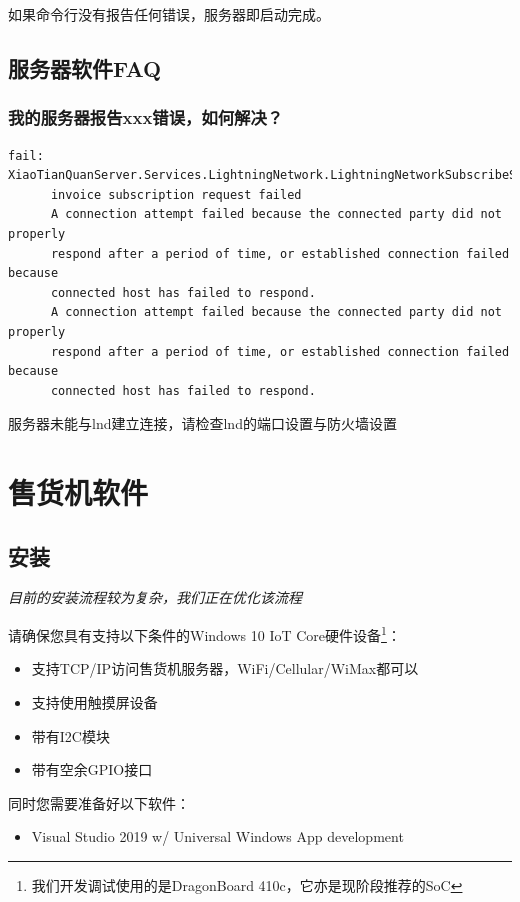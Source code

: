 \documentclass[a4paper,11pt]{article}
\theoremstyle{definition}
\begin{document}
如果命令行没有报告任何错误，服务器即启动完成。

\subsection{服务器软件FAQ}

\subsubsection{我的服务器报告xxx错误，如何解决？}

\begin{verbatim}
fail: XiaoTianQuanServer.Services.LightningNetwork.LightningNetworkSubscribeService[0]
      invoice subscription request failed
      A connection attempt failed because the connected party did not properly
      respond after a period of time, or established connection failed because
      connected host has failed to respond.
      A connection attempt failed because the connected party did not properly
      respond after a period of time, or established connection failed because
      connected host has failed to respond.
\end{verbatim}

服务器未能与lnd建立连接，请检查lnd的端口设置与防火墙设置

\section{售货机软件}

\subsection{安装}

\textit{目前的安装流程较为复杂，我们正在优化该流程}

请确保您具有支持以下条件的Windows 10 IoT Core硬件设备\footnote{我们开发调试使用的是DragonBoard 410c，它亦是现阶段推荐的SoC}：
\begin{itemize}
  \item 支持TCP/IP访问售货机服务器，WiFi/Cellular/WiMax都可以
  \item 支持使用触摸屏设备
  \item 带有I2C模块
  \item 带有空余GPIO接口
\end{itemize}

同时您需要准备好以下软件：
\begin{itemize}
  \item Visual Studio 2019 w/ Universal Windows App development
\end{itemize}
\end{document}
